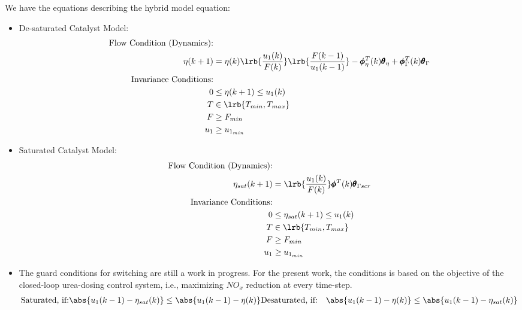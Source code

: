 We have the equations describing the hybrid model equation:
\begin{itemize}
\item De-saturated Catalyst Model:
\begin{align*}
        \text{Flow Condition (Dynamics):} &\\
                \eta(k+1) &= \eta(k) \lrb{\frac{u_1(k)}{F(k)}} \lrb{\frac{F(k-1)}{u_1(k-1)}}
                    - \pmb \phi^T_{\eta}(k) \pmb \theta_{\eta}  + \pmb \phi_{\Gamma}^T(k) \pmb \theta_{\Gamma}
                    \\
        \text{Invariance Conditions:} & \\
                0 &\leq \eta (k+1) \leq u_1(k)\\
                T &\in \lrb{T_{min}, T_{max}}\\
                F &\geq F_{min}\\
                u_1 &\geq u_{1_{min}}
\end{align*}
\item Saturated Catalyst Model:
\begin{align*}
        \text{Flow Condition (Dynamics):} & \\
                \eta_{sat}(k+1) &= \lrb{\frac{u_1(k)}{F(k)}} \pmb \phi^T(k) \pmb \theta_{\Gamma scr}\\
        \text{Invariance Conditions:} & \\
                0 &\leq \eta_{sat} (k+1) \leq u_1(k)\\
                T &\in \lrb{T_{min}, T_{max}}\\
                F &\geq F_{min}\\
                u_1 &\geq u_{1_{min}}
\end{align*}

\item The guard conditions for switching are still a work in progress. For the present work, the conditions is based on the objective of the closed-loop urea-dosing control system, i.e., maximizing $NO_x$ reduction at every time-step.
\begin{align*}
        \text{Saturated, if:} & \abs{u_1(k-1) - \eta_{sat}(k)} \leq \abs{u_1(k-1) - \eta(k)}
        \text{Desaturated, if:} & \abs{u_1(k-1) - \eta(k)} \leq \abs{u_1(k-1) - \eta_{sat}(k)}
\end{align*}
\end{itemize}



